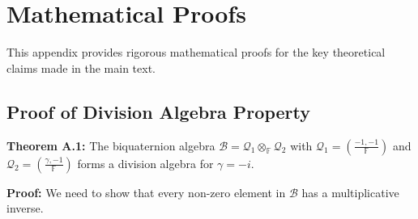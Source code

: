 \appendix

\section{Mathematical Proofs}

This appendix provides rigorous mathematical proofs for the key theoretical claims made in the main text.

\subsection{Proof of Division Algebra Property}

\textbf{Theorem A.1:} The biquaternion algebra $\mathcal{B} = \mathcal{Q}_1 \otimes_{\mathbb{F}} \mathcal{Q}_2$ with $\mathcal{Q}_1 = \left(\frac{-1,-1}{\mathbb{F}}\right)$ and $\mathcal{Q}_2 = \left(\frac{\gamma,-1}{\mathbb{F}}\right)$ forms a division algebra for $\gamma = -i$.

\textbf{Proof:}
We need to show that every non-zero element in $\mathcal{B}$ has a multiplicative inverse.

